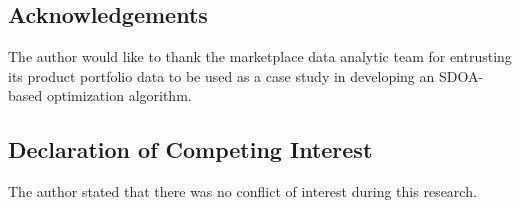 \documentclass[preprint, 3p,
authoryear]{elsarticle} %
\begin{document}
\hypertarget{acknowledgements}{%
\subsection{Acknowledgements}\label{acknowledgements}}

The author would like to thank the marketplace data analytic team for
entrusting its product portfolio data to be used as a case study in
developing an SDOA-based optimization algorithm.

\hypertarget{declaration-of-competing-interest}{%
\subsection{Declaration of Competing
Interest}\label{declaration-of-competing-interest}}

The author stated that there was no conflict of interest during this
research.

\renewcommand\refname{REFERENCES}

\end{document}
